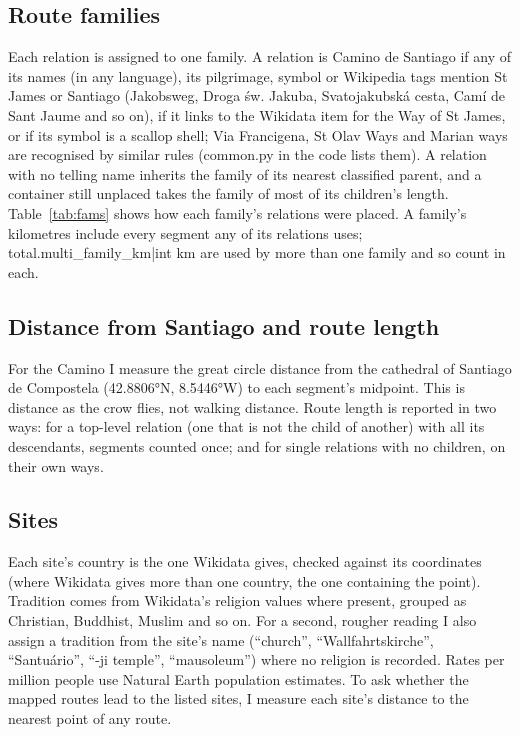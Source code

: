 \documentclass[11pt,a4paper]{article}
\begin{document}
\subsection{Route families}
Each relation is assigned to one family. A relation is Camino de Santiago if any of its names (in any language), its pilgrimage, symbol or Wikipedia tags mention St James or Santiago (Jakobsweg, Droga św. Jakuba, Svatojakubská cesta, Camí de Sant Jaume and so on), if it links to the Wikidata item for the Way of St James, or if its symbol is a scallop shell; Via Francigena, St Olav Ways and Marian ways are recognised by similar rules (common.py in the code lists them). A relation with no telling name inherits the family of its nearest classified parent, and a container still unplaced takes the family of most of its children's length. Table~\ref{tab:fams} shows how each family's relations were placed. A family's kilometres include every segment any of its relations uses; {{total.multi_family_km|int}} km are used by more than one family and so count in each.

\subsection{Distance from Santiago and route length}
For the Camino I measure the great circle distance from the cathedral of Santiago de Compostela (42.8806°N, 8.5446°W) to each segment's midpoint. This is distance as the crow flies, not walking distance. Route length is reported in two ways: for a top-level relation (one that is not the child of another) with all its descendants, segments counted once; and for single relations with no children, on their own ways.

\subsection{Sites}
Each site's country is the one Wikidata gives, checked against its coordinates (where Wikidata gives more than one country, the one containing the point). Tradition comes from Wikidata's religion values where present, grouped as Christian, Buddhist, Muslim and so on. For a second, rougher reading I also assign a tradition from the site's name (``church'', ``Wallfahrtskirche'', ``Santuário'', ``-ji temple'', ``mausoleum'') where no religion is recorded. Rates per million people use Natural Earth population estimates. To ask whether the mapped routes lead to the listed sites, I measure each site's distance to the nearest point of any route.
\end{document}
